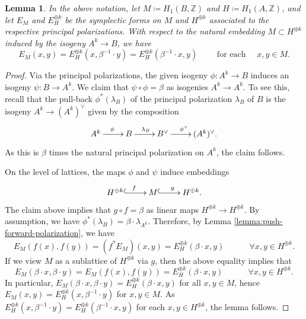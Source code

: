 \documentclass[a4paper,11pt,reqno]{amsart}
\numberwithin{equation}{section}
\theoremstyle{plain}
\newtheorem{lemma}[theorem]{Lemma}
\theoremstyle{definition}
\newcommand{\Z}{\mathbb Z}
\begin{document}
\begin{lemma} \label{lemma:betapullback}
In the above notation, let $M\coloneqq H_1(B,\Z)$ and $H\coloneqq H_1(A,\Z)$, and let $E_M$ and $E_{H}^{\oplus k}$ be the symplectic forms on $M$ and $H^{\oplus k}$ associated to the respective principal polarizations. 
    With respect to the natural embedding $M \subset H^{\oplus k}$ induced by the isogeny $A^k \to B$, we have
    \[
    E_M(x,y) = E_{H}^{\oplus k}(x, \beta^{-1} \cdot y) = E_{H}^{\oplus k}(\beta^{-1} \cdot x, y) \quad \quad  \text{ for each } \quad x,y \in M. 
    \]
\end{lemma}
\begin{proof}
Via the principal polarizations, the given isogeny $\phi \colon A^k \to B$ induces an isogeny $\psi \colon B \to A^k$. We claim that $\psi \circ \phi = \beta$ as isogenies $A^k \to A^k$. To see this, recall that the pull-back $\phi^\ast(\lambda_B)$ of the principal polarization $\lambda_B$ of $B$ is the isogeny $A^k \to (A^k)^\vee$ given by the composition
    \begin{align*} 
    \xymatrix{
    A^k \ar[r]^\phi & B \ar[r]^{\lambda_B} &B^\vee \ar[r]^{\phi^\vee} & (A^k)^\vee. 
    }
    \end{align*}
    As this is $\beta$ times the natural principal polarization on $A^k$, the claim follows. 

    On the level of lattices, the maps $\phi$ and $\psi$ induce embeddings
    \[
    \xymatrix{
    H^{\oplus k} \ar@{^{(}->}[r]^f & M \ar@{^{(}->}[r]^g & H^{\oplus k}.
    }
    \]
    The claim above implies that $g \circ f = \beta$ as linear maps $H^{\oplus k} \to H^{\oplus k}$. 
    By assumption, we have $\phi^\ast(\lambda_B) = \beta \cdot \lambda_{A^k}$. 
    Therefore, by Lemma \ref{lemma:push-forward-polarization}, we have
    \[
E_M(f(x), f(y)) =     \left(f^\ast E_M\right)(x,y) = E_{H}^{\oplus k}(\beta \cdot x, y) \quad \quad \quad \forall x,y \in H^{\oplus k}. 
    \]
If we view $M$ as a sublattice of $H^{\oplus k}$ via $g$, then the above equality implies that 
\[
E_M(\beta \cdot x, \beta \cdot y) = E_M(f(x), f(y)) = E_{H}^{\oplus k}(\beta \cdot x,y) \quad \quad \quad \forall x,y \in H^{\oplus k}. 
\]
In particular,
$
E_M(\beta \cdot x, \beta \cdot y) = E_{H}^{\oplus k}(\beta \cdot x,y)$ for all $x,y \in M$, hence
$
E_M(x, y) = E_{H}^{\oplus k}(x,\beta^{-1} \cdot y)$ for $ x,y \in M$. 
As $E_{H}^{\oplus k}(x, \beta^{-1} \cdot y) = E_{H}^{\oplus k}(\beta^{-1} \cdot x, y)$ for each $x,y \in H^{\oplus k}$, the lemma follows.  
\end{proof}
\end{document}
